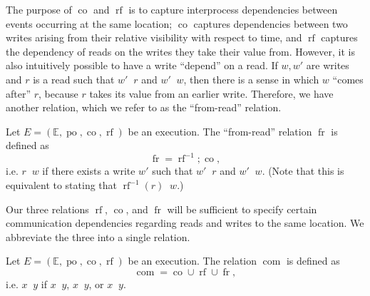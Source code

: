\documentclass[]{eptcs}
\newenvironment{definition}[1][Definition.]{\begin{trivlist}
\item[\hskip \labelsep {\bfseries #1}]}{\end{trivlist}}
\DeclareMathOperator{\po}{po}
\DeclareMathOperator{\co}{co}
\DeclareMathOperator{\rf}{rf}
\DeclareMathOperator{\fr}{fr}
\DeclareMathOperator{\com}{com}
\DeclareMathOperator{\coto}{\xrightarrow{co}}
\DeclareMathOperator{\rfto}{\xrightarrow{rf}}
\DeclareMathOperator{\frto}{\xrightarrow{fr}}
\DeclareMathOperator{\comto}{\xrightarrow{com}}
\newcommand{\rfinv}{\rf^{-1}}
\begin{document}
The purpose of $\co$ and $\rf$ is to capture interprocess dependencies between events occurring at the same location; $\co$ captures dependencies between two writes arising from their relative visibility with respect to time, and $\rf$ captures the dependency of reads on the writes they take their value from. However, it is also intuitively possible to have a write ``depend'' on a read. If $w, w'$ are writes and $r$ is a read such that $w' \rfto r$ and $w' \coto w$, then there is a sense in which $w$ ``comes after'' $r$, because $r$ takes its value from an earlier write. Therefore, we have another relation, which we refer to as the ``from-read'' relation.

\begin{definition}
Let $E = (\mathbb{E}, \po, \co, \rf)$ be an execution. The ``from-read'' relation $\fr$ is defined as
\[
\fr = \rfinv ; \co,
\]
i.e. $r \frto w$ if there exists a write $w'$ such that $w' \rfto r$ and $w' \coto w$. (Note that this is equivalent to stating that $\rfinv(r) \coto w$.)
\end{definition}

Our three relations $\rf$, $\co$, and $\fr$ will be sufficient to specify certain communication dependencies regarding reads and writes to the same location. We abbreviate the three into a single relation.

\begin{definition}
Let $E = (\mathbb{E}, \po, \co, \rf)$ be an execution. The relation $\com$ is defined as
\[
\com = \co \cup \rf \cup \fr,
\]
i.e. $x \comto y$ if $x \coto y$, $x \rfto y$, or $x \frto y$.
\end{definition}
\end{document}
